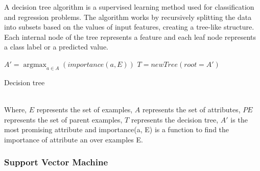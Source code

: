 \documentclass[conference]{IEEEtran}
\begin{document}
		A decision tree algorithm is a supervised learning method used for classification and regression problems. The algorithm works by recursively splitting the data into subsets based on the values of input features, creating a tree-like structure. Each internal node of the tree represents a feature and each leaf node represents a class label or a predicted value.
		\begin{algorithm}[!ht]		
			\vspace{1em}
			{
			$A' = \operatorname{argmax}_{a \in A} (importance(a, E))$\;
			$T = newTree(root=A')$\;
		}
			\caption{Decision tree}
		\end{algorithm}		
	\\Where, $E$ represents the set of examples, $A$ represents the set of attributes, $PE$ represents the set of parent examples, $T$ represents the decision tree, $A'$ is the most promising attribute and importance(a, E) is a function to find the importance of attribute an over examples E.\\
	
	\subsubsection{Support Vector Machine}
	
\end{document}
